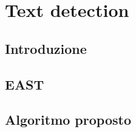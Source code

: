 \chapter{Text detection}
\label{chap:text-detection}

\section{Introduzione}
\section{EAST}
\section{Algoritmo proposto}
